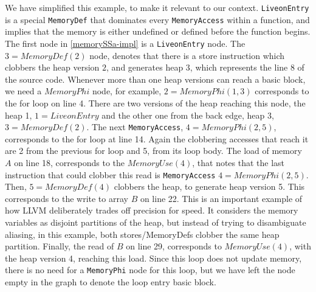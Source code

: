 We have simplified this example, to make it relevant to our context. 
\texttt{LiveonEntry} is a special \texttt{MemoryDef} that dominates every \texttt{MemoryAccess} within a function, 
and implies that the memory is either undefined or defined before the function begins. The first node in \autoref{memorySSa-impl} is a
 \texttt{LiveonEntry} node.
The $3=MemoryDef(2)$ node, 
denotes that there is a store instruction which clobbers the heap version 
$2$, and generates heap $3$, which represents the line 8 of the source code.
Whenever more than one heap versions can reach a basic block, 
we need a $MemoryPhi$ node,
for example, $2=MemoryPhi(1,3)$ corresponds to the for loop on 
line 4. There are two versions of the heap reaching this node, the heap 1, 
$1 = LiveonEntry$ and the other one from the back edge, heap 3, $3=MemoryDef(2)$.
The next \texttt{MemoryAccess}, 
$4=MemoryPhi(2,5)$, corresponds to the for loop at line 14. Again the clobbering accesses that reach it are 2 from the previous for loop and 5, from its loop body. 
The load of memory $A$ on line 18, corresponds to the $MemoryUse(4)$, that notes that the last instruction that could clobber this read is 
\texttt{MemoryAccess} $4=MemoryPhi(2,5)$. 
Then,  $5=MemoryDef(4)$ clobbers the heap, 
to generate heap version 5. This corresponds to the write to 
array $B$ on line 22. 
This is an important example of how LLVM deliberately trades off 
precision for speed. It considers the memory variables as disjoint partitions of the heap, but instead of trying to disambiguate aliasing, 
in this example, both stores/MemoryDefs clobber 
the same heap partition. 
Finally, the read of $B$ on line 29, corresponds to $MemoryUse(4)$,
with the heap version 4, reaching this load. Since this 
loop does not update memory, there is no need for a 
\texttt{MemoryPhi} node for this loop, but we have left
the node empty in the graph to denote the loop entry basic block.

